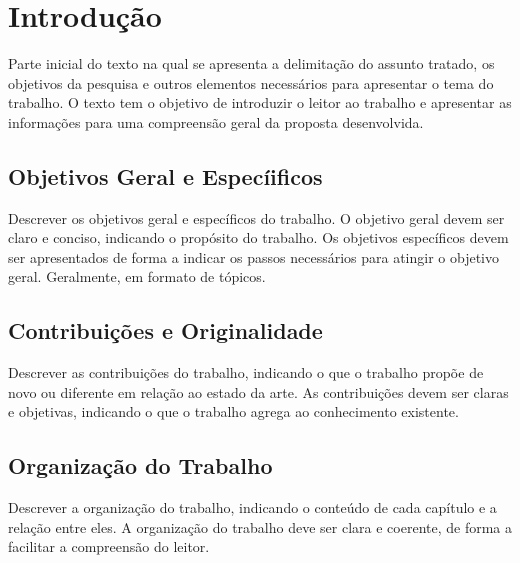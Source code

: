 
\chapter{Introdução}\label{chap:introducao} %

	Parte inicial do texto na qual se apresenta a delimitação do assunto tratado, os 
	objetivos da pesquisa e outros elementos necessários para apresentar o tema 
	do trabalho. O texto tem o objetivo de introduzir o leitor ao trabalho e 
	apresentar as informações para uma compreensão geral da proposta
	desenvolvida.

	\section{Objetivos Geral e Especíificos}\label{sec:introducao:objetivos}

		Descrever os objetivos geral e específicos do trabalho. O objetivo
		geral devem ser claro e conciso, indicando o propósito do trabalho.
		Os objetivos específicos devem ser apresentados de forma a indicar
		os passos necessários para atingir o objetivo geral. Geralmente, em formato de tópicos.

	\section{Contribuições e Originalidade}\label{sec:introducao:contribuicoes}

		Descrever as contribuições do trabalho, indicando o que o trabalho
		propõe de novo ou diferente em relação ao estado da arte. As contribuições
		devem ser claras e objetivas, indicando o que o trabalho agrega ao conhecimento
		existente.
	
	\section{Organização do Trabalho}\label{sec:introducao:organizacao}

		Descrever a organização do trabalho, indicando o conteúdo de cada capítulo
		e a relação entre eles. A organização do trabalho deve ser clara e
		coerente, de forma a facilitar a compreensão do leitor.
